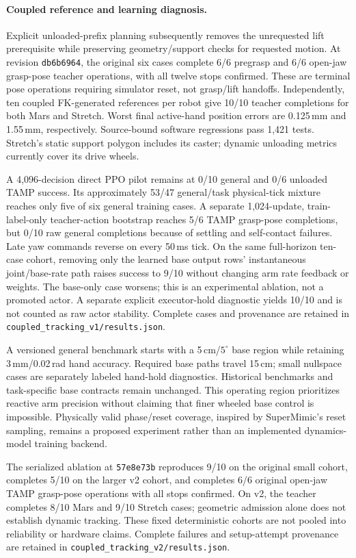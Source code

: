 \paragraph{Coupled reference and learning diagnosis.}
Explicit unloaded-prefix planning subsequently removes the unrequested lift
prerequisite while preserving geometry/support checks for requested motion.
At revision \texttt{db6b6964}, the original six cases complete 6/6 pregrasp and
6/6 open-jaw grasp-pose teacher operations, with all twelve stops confirmed.
These are terminal pose operations requiring simulator reset, not grasp/lift
handoffs. Independently, ten coupled FK-generated references per robot give
10/10 teacher completions for both Mars and Stretch. Worst final active-hand
position errors are 0.125\,mm and 1.55\,mm, respectively. Source-bound software
regressions pass 1,421 tests. Stretch's static support polygon includes its
caster; dynamic unloading metrics currently cover its drive wheels.

A 4,096-decision direct PPO pilot remains at 0/10 general and 0/6 unloaded
TAMP success. Its approximately 53/47 general/task physical-tick mixture reaches
only five of six general training cases. A separate 1,024-update, train-label-only
teacher-action bootstrap reaches 5/6 TAMP grasp-pose completions, but 0/10 raw
general completions because of settling and self-contact failures. Late yaw
commands reverse on every 50\,ms tick. On the same full-horizon ten-case cohort,
removing only the learned base output rows' instantaneous joint/base-rate path
raises success to 9/10 without changing arm rate feedback or weights. The
base-only case worsens; this is an experimental ablation, not a promoted actor.
A separate explicit executor-hold diagnostic yields 10/10 and is not counted as
raw actor stability. Complete cases and provenance are retained in
\texttt{coupled\_tracking\_v1/results.json}.

A versioned general benchmark starts with a 5\,cm/$5^\circ$ base region while
retaining 3\,mm/0.02\,rad hand accuracy. Required base paths travel 15\,cm;
small nullspace cases are separately labeled hand-hold diagnostics. Historical
benchmarks and task-specific base contracts remain unchanged. This operating
region prioritizes reactive arm precision without claiming that finer wheeled
base control is impossible. Physically valid phase/reset coverage, inspired by
SuperMimic's reset sampling, remains a proposed experiment rather than an
implemented dynamics-model training backend.

The serialized ablation at \texttt{57e8e73b} reproduces 9/10 on the original
small cohort, completes 5/10 on the larger v2 cohort, and completes 6/6 original
open-jaw TAMP grasp-pose operations with all stops confirmed. On v2, the teacher
completes 8/10 Mars and 9/10 Stretch cases; geometric admission alone does not
establish dynamic tracking. These fixed deterministic cohorts are not pooled
into reliability or hardware claims. Complete failures and setup-attempt
provenance are retained in \texttt{coupled\_tracking\_v2/results.json}.

